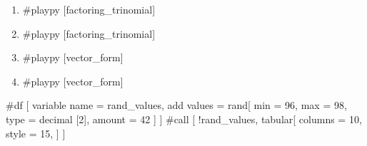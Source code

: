 \documentclass{article}
\begin{document}
\begin{enumerate}

    \item #playpy [factoring_trinomial]

    \item #playpy [factoring_trinomial]

    \item #playpy [vector_form]

    \item #playpy [vector_form]

    

\end{enumerate}

#df [
        variable name = rand_values,
        add values = rand[
            min = 96,
            max = 98,
            type = decimal [2],
            amount = 42
        ]
    ] #call [
        !rand_values,
        tabular[
            columns = 10,
            style = 15,
        ]
    ]
\end{document}
